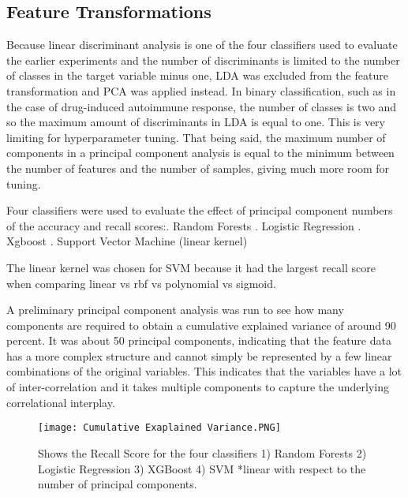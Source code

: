\documentclass{article}
\begin{document}
\begin{itemize}
\subsection{Feature Transformations}

Because linear discriminant analysis is one of the four classifiers used to evaluate the earlier experiments and the number of discriminants is limited to the number of classes in the target variable minus one, LDA was excluded from the feature transformation and PCA was applied instead. In binary classification, such as in the case of drug-induced autoimmune response, the number of classes is two and so the maximum amount of discriminants in LDA is equal to one. This is very limiting for hyperparameter tuning. That being said, the maximum number of components in a principal component analysis is equal to the minimum between the number of features and the number of samples, giving much more room for tuning. \newline

Four classifiers were used to evaluate the effect of principal component numbers of the accuracy and recall scores:. Random Forests . Logistic Regression . Xgboost . Support Vector Machine (linear kernel) \newline

The linear kernel was chosen for SVM because it had the largest recall score when comparing linear vs rbf vs polynomial vs sigmoid. \newline

A preliminary principal component analysis was run to see how many components are required to obtain a cumulative explained variance of around 90 percent. It was about 50 principal components, indicating that the feature data has a more complex structure and cannot simply be represented by a few linear combinations of the original variables. This indicates that the variables have a lot of inter-correlation and it takes multiple components to capture the underlying correlational interplay.
\begin{figure}[hbt!]
\texttt{[image: Cumulative Exaplained Variance.PNG]}
\caption{Shows the Recall Score for the four classifiers 1) Random Forests 2) Logistic Regression 3) XGBoost 4) SVM *linear with respect to the number of principal components.}
\end{figure}


\end{itemize}
\end{document}
